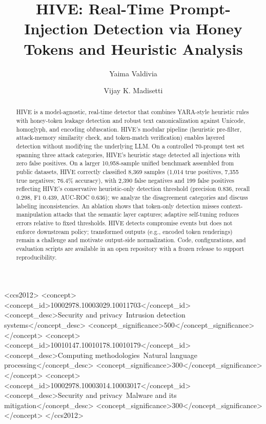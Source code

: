\documentclass[manuscript,screen,review]{acmart}
\begin{document}
\title{HIVE: Real-Time Prompt-Injection Detection via Honey Tokens and Heuristic Analysis}

\author{Yaima Valdivia}

\author{Vijay K. Madisetti}

\renewcommand{\shortauthors}{Valdivia and Madisetti}

\begin{abstract}
HIVE is a model-agnostic, real-time detector that combines YARA-style heuristic rules with honey-token leakage detection and robust text canonicalization against Unicode, homoglyph, and encoding obfuscation. HIVE's modular pipeline (heuristic pre-filter, attack-memory similarity check, and token-match verification) enables layered detection without modifying the underlying LLM.
On a controlled 70-prompt test set spanning three attack categories, HIVE's heuristic stage detected all injections with zero false positives. On a larger 10{,}958-sample unified benchmark assembled from public datasets, HIVE correctly classified 8{,}369 samples (1{,}014 true positives, 7{,}355 true negatives; 76.4\% accuracy), with 2{,}390 false negatives and 199 false positives reflecting HIVE's conservative heuristic-only detection threshold (precision 0.836, recall 0.298, F1 0.439, AUC-ROC 0.636); we analyze the disagreement categories and discuss labeling inconsistencies. An ablation shows that token-only detection misses context-manipulation attacks that the semantic layer captures; adaptive self-tuning reduces errors relative to fixed thresholds.
HIVE detects compromise events but does not enforce downstream policy; transformed outputs (e.g., encoded token renderings) remain a challenge and motivate output-side normalization. Code, configurations, and evaluation scripts are available in an open repository with a frozen release to support reproducibility.
\end{abstract}

\begin{CCSXML}
<ccs2012>
 <concept>
  <concept_id>10002978.10003029.10011703</concept_id>
  <concept_desc>Security and privacy~Intrusion detection systems</concept_desc>
  <concept_significance>500</concept_significance>
 </concept>
 <concept>
  <concept_id>10010147.10010178.10010179</concept_id>
  <concept_desc>Computing methodologies~Natural language processing</concept_desc>
  <concept_significance>300</concept_significance>
 </concept>
 <concept>
  <concept_id>10002978.10003014.10003017</concept_id>
  <concept_desc>Security and privacy~Malware and its mitigation</concept_desc>
  <concept_significance>300</concept_significance>
 </concept>
</ccs2012>
\end{CCSXML}
\end{document}
